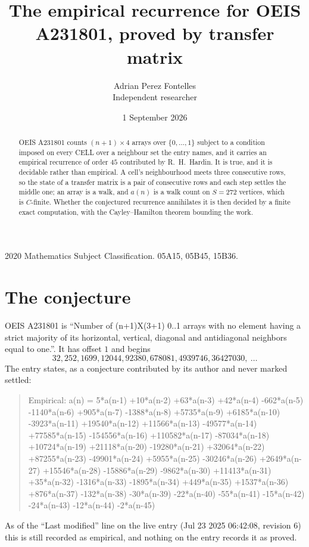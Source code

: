 \documentclass[11pt,a4paper]{article}
\title{The empirical recurrence for OEIS A231801, proved by transfer matrix}
\author{Adrian Perez Fontelles\\ \small Independent researcher}
\date{1 September 2026}
\theoremstyle{plain}
\theoremstyle{definition}
\begin{document}
\maketitle

\begin{abstract}
OEIS A231801 counts $(n+1)\times4$ arrays over $\{0,\dots,1\}$ subject to a condition imposed on
every CELL over a neighbour set the entry names, and it carries an empirical recurrence of
order $45$ contributed by R.~H.~Hardin. It is true, and it is decidable rather than
empirical. A cell's neighbourhood meets three consecutive rows, so the state of a transfer
matrix is a pair of consecutive rows and each step settles the middle one; an array is a
walk, and $a(n)$ is a walk count on $S=272$ vertices, which is $C$-finite. Whether the
conjectured recurrence annihilates it is then decided by a finite exact computation, with the
Cayley--Hamilton theorem bounding the work.
\end{abstract}

\noindent\small 2020 Mathematics Subject Classification. 05A15, 05B45, 15B36.\normalsize

\section{The conjecture}

OEIS A231801 is ``Number of (n+1)X(3+1) 0..1 arrays with no element having a strict majority of its horizontal, vertical, diagonal and antidiagonal neighbors equal to one.''. It has offset $1$ and begins
\[
32, 252, 1699, 12044, 92380, 678081, 4939746, 36427030,\ \dots
\]
The entry states, as a conjecture contributed by its author and never marked settled:
\begin{quote}
Empirical: a(n) = 5*a(n-1) +10*a(n-2) +63*a(n-3) +42*a(n-4) -662*a(n-5) -1140*a(n-6) +905*a(n-7) -1388*a(n-8) +5735*a(n-9) +6185*a(n-10) -3923*a(n-11) +19540*a(n-12) +11566*a(n-13) -49577*a(n-14) +77585*a(n-15) -154556*a(n-16) +110582*a(n-17) -87034*a(n-18) +10724*a(n-19) +21118*a(n-20) -19280*a(n-21) +32064*a(n-22) +87255*a(n-23) -49901*a(n-24) +5955*a(n-25) -30246*a(n-26) +2649*a(n-27) +15546*a(n-28) -15886*a(n-29) -9862*a(n-30) +11413*a(n-31) +35*a(n-32) -1316*a(n-33) -1895*a(n-34) +449*a(n-35) +1537*a(n-36) +876*a(n-37) -132*a(n-38) -30*a(n-39) -22*a(n-40) -55*a(n-41) -15*a(n-42) -24*a(n-43) -12*a(n-44) -2*a(n-45)
\end{quote}
As of the ``Last modified'' line on the live entry (Jul 23 2025 06:42:08, revision 6) this is still
recorded as empirical, and nothing on the entry records it as proved.
\end{document}
